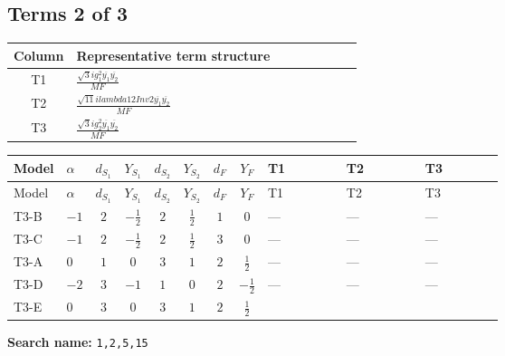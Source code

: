 \documentclass[8pt]{article}
\begin{document}
\begin{landscape}
\subsection*{Terms 2 of 3}
\begin{center}
\begin{tabular}{@{}c >{\raggedright\arraybackslash}p{0.82\linewidth}@{}}
\toprule
Column & Representative term structure \\
\midrule
T1 & \(\displaystyle \frac{\sqrt{3} i g_{1}^{2} \overline{y_{1}} \overline{y_{2}}}{MF}\) \\
\midrule
T2 & \(\displaystyle \frac{\sqrt{11} i lambda12Inv2 \overline{y_{1}} \overline{y_{2}}}{MF}\) \\
\midrule
T3 & \(\displaystyle \frac{\sqrt{3} i g_{2}^{2} \overline{y_{1}} \overline{y_{2}}}{MF}\) \\
\midrule
\bottomrule
\end{tabular}
\end{center}
\smallskip
\tiny
\begin{longtable}{@{}llcccccc >{\raggedright\arraybackslash}p{0.21\linewidth} >{\raggedright\arraybackslash}p{0.21\linewidth} >{\raggedright\arraybackslash}p{0.21\linewidth}@{}}
\toprule
Model & $\alpha$ & $d_{S_1}$ & $Y_{S_1}$ & $d_{S_2}$ & $Y_{S_2}$ & $d_F$ & $Y_F$ & T1 & T2 & T3 \\
\midrule
\endfirsthead
\toprule
Model & $\alpha$ & $d_{S_1}$ & $Y_{S_1}$ & $d_{S_2}$ & $Y_{S_2}$ & $d_F$ & $Y_F$ & T1 & T2 & T3 \\
\midrule
\endhead
T3-B & $-1$ & $2$ & $-\frac{1}{2}$ & $2$ & $\frac{1}{2}$ & $1$ & $0$ & --- & --- & --- \\
\midrule
T3-C & $-1$ & $2$ & $-\frac{1}{2}$ & $2$ & $\frac{1}{2}$ & $3$ & $0$ & --- & --- & --- \\
\midrule
T3-A & $0$ & $1$ & $0$ & $3$ & $1$ & $2$ & $\frac{1}{2}$ & --- & --- & --- \\
\midrule
T3-D & $-2$ & $3$ & $-1$ & $1$ & $0$ & $2$ & $-\frac{1}{2}$ & --- & --- & --- \\
\midrule
T3-E & $0$ & $3$ & $0$ & $3$ & $1$ & $2$ & $\frac{1}{2}$ & \scriptsize\adjustbox{max width=\linewidth}{$\begin{gathered} \frac{\sqrt{3} i g_{1}^{2} \overline{y_{1}} \overline{y_{2}}}{8 MF}\end{gathered}$} & \scriptsize\adjustbox{max width=\linewidth}{$\begin{gathered} \frac{3 \sqrt{11} i lambda12Inv2 \overline{y_{1}} \overline{y_{2}}}{22 MF}\end{gathered}$} & \scriptsize\adjustbox{max width=\linewidth}{$\begin{gathered} \frac{15 \sqrt{3} i g_{2}^{2} \overline{y_{1}} \overline{y_{2}}}{8 MF}\end{gathered}$} \\
\midrule
\bottomrule
\end{longtable}
\clearpage
\noindent\textbf{Search name: }\texttt{1,2,5,15}\par\smallskip

\end{landscape}
\end{document}
